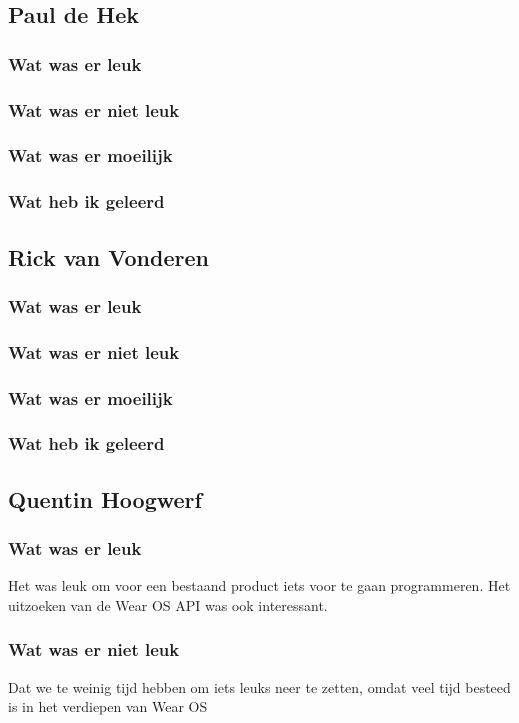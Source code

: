 \documentclass[../main.tex]{subfiles}
\begin{document}
\subsection{Paul de Hek}
\subsubsection{Wat was er leuk}
\subsubsection{Wat was er niet leuk}
\subsubsection{Wat was er moeilijk}
\subsubsection{Wat heb ik geleerd}
\newpage

\subsection{Rick van Vonderen}
\subsubsection{Wat was er leuk}
\subsubsection{Wat was er niet leuk}
\subsubsection{Wat was er moeilijk}
\subsubsection{Wat heb ik geleerd}
\newpage

\subsection{Quentin Hoogwerf}
\subsubsection{Wat was er leuk}
Het was leuk om voor een bestaand product iets voor te gaan programmeren. Het uitzoeken van de
Wear OS API was ook interessant.
\subsubsection{Wat was er niet leuk}
Dat we te weinig tijd hebben om iets leuks neer te zetten, omdat veel tijd besteed is in het verdiepen
van Wear OS
\end{document}
